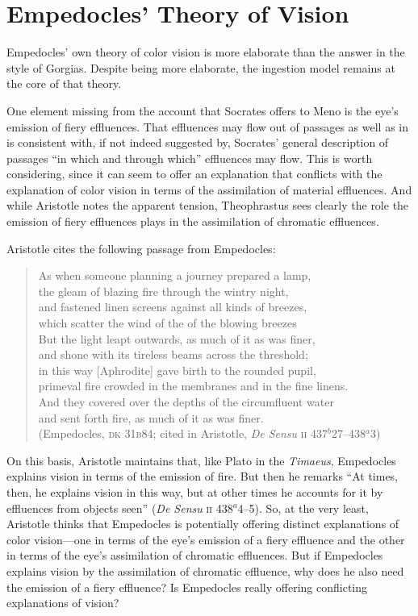 
\section{Empedocles' Theory of Vision} %
\label{sec:empedocles_theory_of_vision}

Empedocles' own theory of color vision is more elaborate than the answer in the style of Gorgias. Despite being more elaborate, the ingestion model remains at the core of that theory. 

One element missing from the account that Socrates offers to Meno is the eye's emission of fiery effluences. That effluences may flow out of passages as well as in is consistent with, if not indeed suggested by, Socrates' general description of passages ``in which and through which'' effluences may flow. This is worth considering, since it can seem to offer an explanation that conflicts with the explanation of color vision in terms of the assimilation of material effluences. And while Aristotle notes the apparent tension, Theophrastus sees clearly the role the emission of fiery effluences plays in the assimilation of chromatic effluences.

Aristotle cites the following passage from Empedocles:
\begin{verse}
	As when someone planning a journey prepared a lamp,\\
	the gleam of blazing fire through the wintry night,\\
	and fastened linen screens against all kinds of breezes,\\
	which scatter the wind of the of the blowing breezes\\
	But the light leapt outwards, as much of it as was finer,\\
	and shone with its tireless beams across the threshold;\\
	in this way [Aphrodite] gave birth to the rounded pupil,\\
	primeval fire crowded in the membranes and in the fine linens.\\
	And they covered over the depths of the circumfluent water\\
	and sent forth fire, as much of it as was finer.\\
	(Empedocles, \textsc{dk} 31\textsc{b}84; cited in Aristotle, \emph{De Sensu} \textsc{ii} 437\( ^{b} \)27--438\( ^{a} \)3)
\end{verse}
On this basis, Aristotle maintains that, like Plato in the \emph{Timaeus}, Empedocles explains vision in terms of the emission of fire. But then he remarks ``At times, then, he explains vision in this way, but at other times he accounts for it by effluences from objects seen'' (\emph{De Sensu} \textsc{ii} 438\( ^{a} \)4--5). So, at the very least, Aristotle thinks that Empedocles is potentially offering distinct explanations of color vision---one in terms of the eye's emission of a fiery effluence and the other in terms of the eye's assimilation of chromatic effluences. But if Empedocles explains vision by the assimilation of chromatic effluence, why does he also need the emission of a fiery effluence? Is Empedocles really offering conflicting explanations of vision? 


